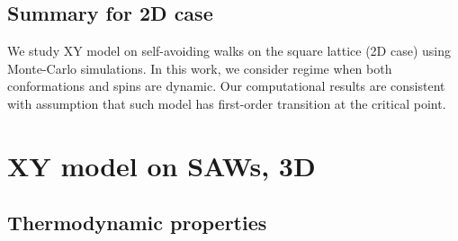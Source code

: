 \subsection{Summary for 2D case}
We study XY model on self-avoiding walks on the square lattice (2D case) using Monte-Carlo simulations. In this work, we consider regime when both conformations and spins are dynamic. Our computational results are consistent with assumption that such model has first-order transition at the critical point. 





\section{XY model on SAWs, 3D}


\subsection{Thermodynamic properties}

